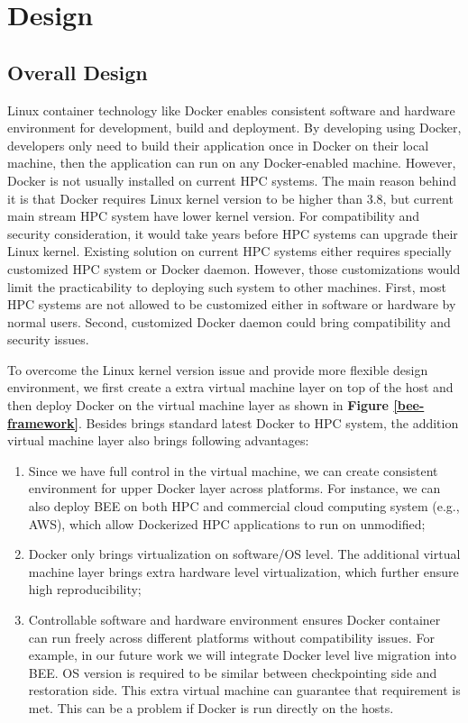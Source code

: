 \section{Design}
  \label{sec:Design}
  \subsection{Overall Design}
Linux container technology like Docker enables consistent software and hardware environment for development, build and deployment. By developing using Docker, developers only need to build their application once in Docker on their local machine, then the application can run on any Docker-enabled machine. However, Docker is not usually installed on current HPC systems. The main reason behind it is that Docker requires Linux kernel version to be higher than 3.8, but current main stream HPC system have lower kernel version. For compatibility and security consideration, it would take years before HPC systems can upgrade their Linux kernel. Existing solution on current HPC systems either requires specially customized HPC system or Docker daemon. However, those customizations would limit the practicability to deploying such system to other machines. First, most HPC systems are not allowed to be customized either in software or hardware by normal users. Second, customized Docker daemon could bring compatibility and security issues. 
  
To overcome the Linux kernel version issue and provide more flexible design environment, we first create a extra virtual machine layer on top of the host and then deploy Docker on the virtual machine layer as shown in \textbf{Figure \ref{bee-framework}}. Besides brings standard latest Docker to HPC system, the addition virtual machine layer also brings following advantages: 

\begin{enumerate}
\item Since we have full control in the virtual machine, we can create consistent environment for upper Docker layer across platforms. For instance, we can also deploy BEE on both HPC and commercial cloud computing system (e.g., AWS), which allow Dockerized HPC applications to run on unmodified; 
\item Docker only brings virtualization on software/OS level. The additional virtual machine layer brings extra hardware level virtualization, which further ensure high reproducibility; 
\item Controllable software and hardware environment ensures Docker container can run freely across different platforms without compatibility issues. For example, in our future work we will integrate Docker level live migration into BEE. OS version is required to be similar between checkpointing side and restoration side. This extra virtual machine can guarantee that requirement is met. This can be a problem if Docker is run directly on the hosts.  
\end{enumerate}

